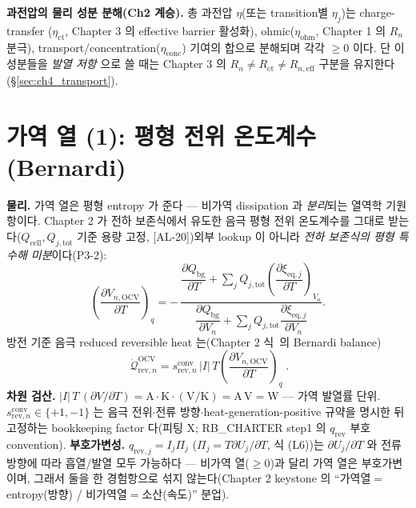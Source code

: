 \documentclass[11pt,a4paper]{article}
\newcommand{\eff}{\mathrm{eff}}
\newcommand{\eq}{\mathrm{eq}}
\newcommand{\bg}{\mathrm{bg}}
\newcommand{\cell}{\mathrm{cell}}
\newcommand{\OCV}{\mathrm{OCV}}
\newcommand{\tot}{\mathrm{tot}}
\newcommand{\rev}{\mathrm{rev}}
\newcommand{\ct}{\mathrm{ct}}
\newcommand{\ohm}{\mathrm{ohm}}
\newcommand{\conc}{\mathrm{conc}}
\newcommand{\conv}{\mathrm{conv}}
\newcommand{\AL}[1]{\textsf{[AL-#1]}}
\begin{document}
\textbf{과전압의 물리 성분 분해(Ch2 계승).} 총 과전압 $\eta$(또는 transition별 $\eta_j$)는 charge-transfer
($\eta_\ct$, Chapter 3 의 effective barrier 활성화), ohmic($\eta_\ohm$, Chapter 1 의 $R_n$ 분극),
transport/concentration($\eta_\conc$) 기여의 합으로 분해되며 각각 $\ge0$ 이다. 단 이 성분들을 \emph{발열 저항}
으로 쓸 때는 Chapter 3 의 $R_n\ne R_\ct\ne R_{n,\eff}$ 구분을 유지한다(\S\ref{sec:ch4_transport}).

\section{가역 열 (1): 평형 전위 온도계수 (Bernardi)}\label{sec:ch4_revOCV}
\textbf{물리.} 가역 열은 평형 entropy 가 준다 — 비가역 dissipation 과 \emph{분리}되는 열역학 기원 항이다.
Chapter 2 가 전하 보존식에서 유도한 음극 평형 전위 온도계수를 그대로 받는다($Q_\cell,Q_{j,\tot}$ 기준 용량
고정, \AL{20})\textemdash 외부 lookup 이 아니라 \emph{전하 보존식의 평형 특수해 미분}이다(P3-2):
\begin{equation}
\left(\frac{\partial V_{n,\OCV}}{\partial T}\right)_q
=-\,\frac{\dfrac{\partial Q_\bg}{\partial T}+\displaystyle\sum_j Q_{j,\tot}\left(\dfrac{\partial\xi_{\eq,j}}{\partial T}\right)_{V_n}}
{\dfrac{\partial Q_\bg}{\partial V_n}+\displaystyle\sum_j Q_{j,\tot}\dfrac{\partial\xi_{\eq,j}}{\partial V_n}}.
\label{eq:ch4_ocv_dvdt}
\end{equation}
방전 기준 음극 reduced reversible heat 는(Chapter 2 식~의 Bernardi balance)
\begin{equation}
\boxed{\;\dot{\mathcal Q}_{\rev,n}^{\OCV}=s_{\rev,n}^{\conv}\,|I|\,T\left(\frac{\partial V_{n,\OCV}}{\partial T}\right)_q\;.}
\label{eq:ch4_rev_ocv}
\end{equation}
\textbf{차원 검산.} $|I|\,T\,(\partial V/\partial T)=\mathrm A\cdot\mathrm K\cdot(\mathrm{V/K})=\mathrm{A\,V}=\mathrm W$
— 가역 발열률 단위. $s_{\rev,n}^{\conv}\in\{+1,-1\}$ 는 음극 전위$\cdot$전류 방향$\cdot$heat-generation-positive
규약을 명시한 뒤 고정하는 bookkeeping factor 다(피팅 X; RB\_CHARTER step1 의 $q_\rev$ 부호 convention).
\textbf{부호가변성.} $q_{\rev,j}=I_j\Pi_j$ ($\Pi_j=T\partial U_j/\partial T$, 식 (L6))는 $\partial U_j/\partial T$
와 전류 방향에 따라 흡열/발열 모두 가능하다 — 비가역 열($\ge0$)과 달리 가역 열은 부호가변이며, 그래서 둘을 한
경험항으로 섞지 않는다(Chapter 2 keystone 의 ``가역열$=$entropy(방향) / 비가역열$=$소산(속도)'' 분업).
\end{document}

